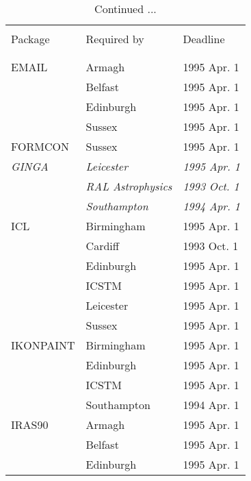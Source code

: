 \addtocounter{table}{-1}
\begin{table}
\caption{Continued ...}
\vspace{5mm}
\begin{center}
\begin{tabular}{|p{36mm}|p{50mm}|p{30mm}|} \hline
& & \\
Package & Required by & Deadline \\
& & \\ \hline
& & \\
EMAIL                   & Armagh           & 1995 Apr. 1 \\
                        & Belfast          & 1995 Apr. 1 \\
                        & Edinburgh        & 1995 Apr. 1 \\
                        & Sussex           & 1995 Apr. 1 \\
FORMCON                 & Sussex           & 1995 Apr. 1 \\
{\em GINGA}             & {\em Leicester}        & {\em 1995 Apr. 1} \\
                        & {\em RAL Astrophysics} & {\em 1993 Oct. 1} \\
                        & {\em Southampton}      & {\em 1994 Apr. 1} \\
ICL                     & Birmingham       & 1995 Apr. 1 \\
                        & Cardiff          & 1993 Oct. 1 \\
                        & Edinburgh        & 1995 Apr. 1 \\
                        & ICSTM            & 1995 Apr. 1 \\
                        & Leicester        & 1995 Apr. 1 \\
                        & Sussex           & 1995 Apr. 1 \\
IKONPAINT               & Birmingham       & 1995 Apr. 1 \\
                        & Edinburgh        & 1995 Apr. 1 \\
                        & ICSTM            & 1995 Apr. 1 \\
                        & Southampton      & 1994 Apr. 1 \\
IRAS90                  & Armagh           & 1995 Apr. 1 \\
                        & Belfast          & 1995 Apr. 1 \\
                        & Edinburgh        & 1995 Apr. 1 \\

\end{tabular}
\end{center}
\end{table}
